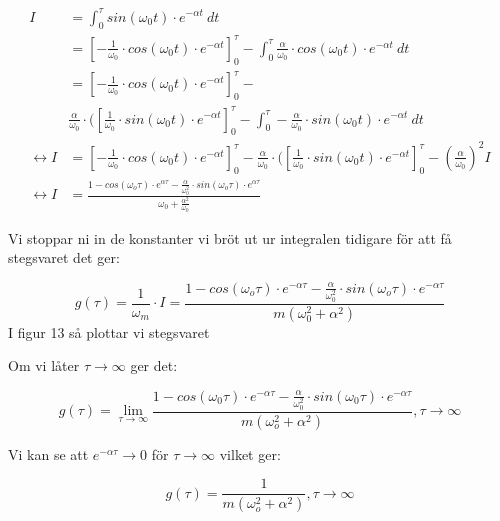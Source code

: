 \documentclass[10pt,a4paper]{article}
\begin{document}
\begin{equation}
\begin{split} 
I & = \int_0^\tau sin(\omega_0 t)\cdot e^{-\alpha t} \  dt  \\
& = [-\frac{1}{\omega_0} \cdot cos(\omega_0 t) \cdot e^{-\alpha t}]_0^\tau - \int_0^\tau \frac{\alpha}{\omega_0} \cdot cos(\omega_0 t) \cdot e^{-\alpha t}  \ dt \\
& = [-\frac{1}{\omega_0} \cdot cos(\omega_0 t) \cdot e^{-\alpha t}]_0^\tau - \\
& \frac{\alpha}{\omega_0} \cdot ([\frac{1}{\omega_0} \cdot sin(\omega_0 t) \cdot e^{-\alpha t}]_0^\tau - \int_0^\tau -\frac{\alpha}{\omega_0} \cdot sin(\omega_0  t)\cdot e^{-\alpha t}  \ dt \\
\leftrightarrow
I & = [-\frac{1}{\omega_0} \cdot cos(\omega_0 t) \cdot e^{-\alpha t}]_0^\tau - \frac{\alpha}{\omega_0} \cdot ([\frac{1}{\omega_0} \cdot sin(\omega_0 t) \cdot e^{-\alpha t}]_0^\tau - (\frac{\alpha}{\omega_0})^2 I \\
\leftrightarrow I & = \frac{1-cos(\omega_o \tau) \cdot e^{\alpha \tau} - \frac{\alpha}{\omega_0^2} \cdot sin(\omega_o \tau) \cdot e^{\alpha \tau}}{\omega_0 + \frac{\alpha^2}{\omega_0}}
\end{split}
\end{equation}

Vi stoppar ni in de konstanter vi bröt ut ur integralen tidigare för att få stegsvaret det ger:

\begin{equation}
g(\tau)= \frac{1}{\omega_ m} \cdot I = \frac{1-cos(\omega_o \tau) \cdot e^{-\alpha  \tau} - \frac{\alpha}{\omega_0^2} \cdot sin(\omega_o \tau) \cdot e^{-\alpha \tau}}{m (\omega_0^2 + \alpha^2)}
\end{equation}
I figur 13 så plottar vi stegsvaret
\newpage



Om vi låter $\tau \to \infty$ ger det:

\begin{equation}
g(\tau) = \lim_{\tau \to \infty} \frac{1 - cos(\omega_0 \tau) \cdot e^{-\alpha \tau}
- \frac{\alpha}{\omega_0^2} \cdot sin(\omega_0  \tau) \cdot e^{-\alpha  \tau}}{m  (\omega_o^2 +\alpha^2)}, \tau \to \infty
\end{equation}

Vi kan se att $e^{-\alpha  \tau} \to 0$ för $\tau \to \infty$ vilket ger:

\begin{equation}
g(\tau) = \frac{1}{m  (\omega_o^2 +\alpha^2)} , \tau \to \infty
\end{equation}
\end{document}
